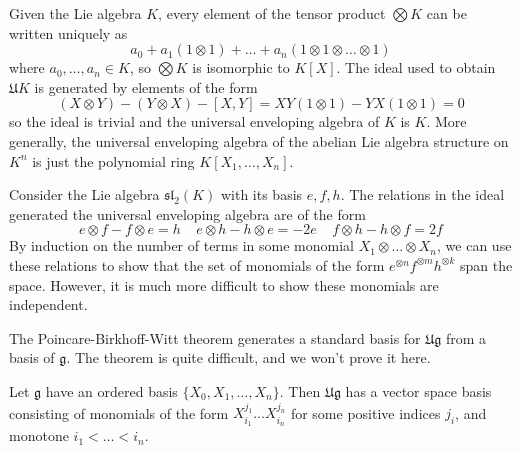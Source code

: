 \begin{example}
    Given the Lie algebra $K$, every element of the tensor product $\bigotimes K$ can be written uniquely as
    \[ a_0 + a_1 (1 \otimes 1) + \dots + a_n (1 \otimes 1 \otimes \dots \otimes 1) \]
    where $a_0, \dots, a_n \in K$, so $\bigotimes K$ is isomorphic to $K[X]$. The ideal used to obtain $\mathfrak{U} K$ is generated by elements of the form
    \[ (X \otimes Y) - (Y \otimes X) - [X,Y] = XY (1 \otimes 1) - YX (1 \otimes 1) = 0 \]
    so the ideal is trivial and the universal enveloping algebra of $K$ is $K$. More generally, the universal enveloping algebra of the abelian Lie algebra structure on $K^n$ is just the polynomial ring $K[X_1, \dots, X_n]$.
\end{example}

\begin{example}
    Consider the Lie algebra $\mathfrak{sl}_2(K)$ with its basis $e,f,h$. The relations in the ideal generated the universal enveloping algebra are of the form
    \[ e \otimes f - f \otimes e = h\ \ \ \ \ e \otimes h - h \otimes e = -2e\ \ \ \ \ f \otimes h - h \otimes f = 2f \]
    By induction on the number of terms in some monomial $X_1 \otimes \dots \otimes X_n$, we can use these relations to show that the set of monomials of the form $e^{\otimes n} f^{\otimes m} h^{\otimes k}$ span the space. However, it is much more difficult to show these monomials are independent.
\end{example}

The Poincare-Birkhoff-Witt theorem generates a standard basis for $\mathfrak{Ug}$ from a basis of $\mathfrak{g}$. The theorem is quite difficult, and we won't prove it here.

\begin{theorem}
    Let $\mathfrak{g}$ have an ordered basis $\{ X_0, X_1, \dots, X_n \}$. Then $\mathfrak{Ug}$ has a vector space basis consisting of monomials of the form $X_{i_1}^{j_1} \dots X_{i_n}^{j_n}$ for some positive indices $j_i$, and monotone $i_1 < \dots < i_n$.
\end{theorem}


